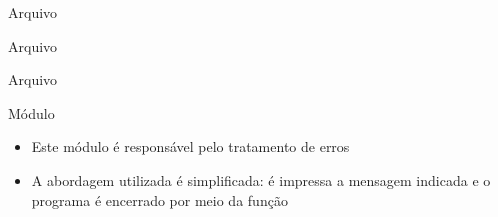 \begin{frame}[fragile]{Arquivo }
\end{frame}

\begin{frame}[fragile]{Arquivo }
\end{frame}

\begin{frame}[fragile]{Arquivo }
\end{frame}

\begin{frame}[fragile]{Módulo }

    \begin{itemize}
        \item Este módulo é responsável pelo tratamento de erros
        \pause

        \item A abordagem utilizada é simplificada: é impressa a mensagem indicada e o programa é encerrado por meio da função 
        \pause

    \end{itemize}

\end{frame}
